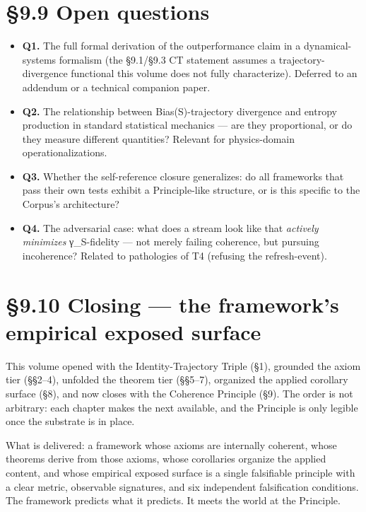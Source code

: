 \documentclass[11pt, openany]{book}
\newcommand{\sectionbreak}{\clearpage}
\begin{document}
\sectionbreak

\section{§9.9 Open questions}

\begin{itemize}
\item \textbf{Q1.} The full formal derivation of the outperformance claim in a dynamical-systems formalism (the §9.1/§9.3 CT statement assumes a trajectory-divergence functional this volume does not fully characterize). Deferred to an addendum or a technical companion paper.
\item \textbf{Q2.} The relationship between Bias(S)-trajectory divergence and entropy production in standard statistical mechanics --- are they proportional, or do they measure different quantities? Relevant for physics-domain operationalizations.
\item \textbf{Q3.} Whether the self-reference closure generalizes: do all frameworks that pass their own tests exhibit a Principle-like structure, or is this specific to the Corpus's architecture?
\item \textbf{Q4.} The adversarial case: what does a stream look like that \textit{actively minimizes} γ\_\allowbreak{}S-fidelity --- not merely failing coherence, but pursuing incoherence? Related to pathologies of T4 (refusing the refresh-event).
\end{itemize}

\sectionbreak

\section{§9.10 Closing --- the framework's empirical exposed surface}

This volume opened with the Identity-Trajectory Triple (§1), grounded the axiom tier (§§2–4), unfolded the theorem tier (§§5–7), organized the applied corollary surface (§8), and now closes with the Coherence Principle (§9). The order is not arbitrary: each chapter makes the next available, and the Principle is only legible once the substrate is in place.

What is delivered: a framework whose axioms are internally coherent, whose theorems derive from those axioms, whose corollaries organize the applied content, and whose empirical exposed surface is a single falsifiable principle with a clear metric, observable signatures, and six independent falsification conditions. The framework predicts what it predicts. It meets the world at the Principle.
\end{document}

